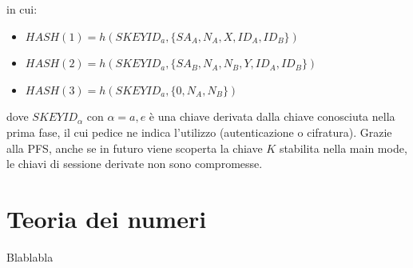 \documentclass[a4paper, 11pt, notitlepage, fleqn]{report}
\begin{document}
in cui:
\begin{itemize}
	\item $HASH(1) = h(SKEYID_a,\{SA_A,N_A,X,ID_A,ID_B\})$
	\item $HASH(2) = h(SKEYID_a,\{SA_B,N_A,N_B,Y,ID_A,ID_B\})$
	\item $HASH(3) = h(SKEYID_a,\{0,N_A,N_B\})$
\end{itemize}
dove $SKEYID_\alpha$ con $\alpha=a,e$ è una chiave derivata dalla chiave conosciuta nella prima fase, il cui pedice ne indica l'utilizzo (autenticazione o cifratura). Grazie alla PFS, anche se in futuro viene scoperta la chiave $K$ stabilita nella main mode, le chiavi di sessione derivate non sono compromesse.


















\appendix
\chapter{Teoria dei numeri}
Blablabla
\end{document}
